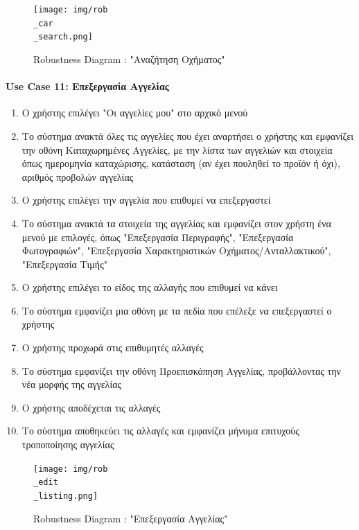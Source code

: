 \documentclass{../ol-softwaremanual}
\begin{document}
	\begin{figure}[htbp!]
		\texttt{[image: img/rob\\\_car\\\_search.png]}
		\caption{\en Robustness Diagram : "\gr Αναζήτηση Οχήματος\en"\gr}
	\end{figure}
	
	
	
	
	\newpage
	\centering
	
	\paragraph{\en Use Case 11: \gr Επεξεργασία Αγγελίας \gr}
	
	\begin{enumerate}
		\item Ο χρήστης επιλέγει \en"\gr Οι αγγελίες μου\en" \gr στο αρχικό μενού
		\item Το σύστημα ανακτά όλες τις αγγελίες που έχει αναρτήσει ο χρήστης και εμφανίζει την οθόνη Καταχωρημένες Αγγελίες, με την λίστα των αγγελιών και στοιχεία όπως ημερομηνία καταχώρισης, κατάσταση (αν έχει πουληθεί το προϊόν ή όχι), αριθμός προβολών αγγελίας
		\item Ο χρήστης επιλέγει την αγγελία που επιθυμεί να επεξεργαστεί
		\item Το σύστημα ανακτά τα στοιχεία της αγγελίας και εμφανίζει στον χρήστη ένα μενού με επιλογές, όπως \en"\gr Επεξεργασία Περιγραφής\en"\gr , \en"\gr Επεξεργασία Φωτογραφιών\en"\gr, \en"\gr Επεξεργασία Χαρακτηριστικών Οχήματος/Ανταλλακτικού\en"\gr, \en"\gr Επεξεργασία Τιμής\en"\gr
		\item Ο χρήστης επιλέγει το είδος της αλλαγής που επιθυμεί να κάνει 
		\item Το σύστημα εμφανίζει μια οθόνη με τα πεδία που επέλεξε να επεξεργαστεί ο χρήστης
		\item Ο χρήστης προχωρά στις επιθυμητές αλλαγές
		\item Το σύστημα εμφανίζει την οθόνη Προεπισκόπηση Αγγελίας, προβάλλοντας την νέα μορφής της αγγελίας
		\item Ο χρήστης αποδέχεται τις αλλαγές
		\item Το σύστημα αποθηκεύει τις αλλαγές και εμφανίζει μήνυμα επιτυχούς τροποποίησης αγγελίας
	\end{enumerate}
	
	
	\begin{figure}[htbp!]
		\texttt{[image: img/rob\\\_edit\\\_listing.png]}
		\caption{\en Robustness Diagram : "\gr Επεξεργασία Αγγελίας\en"\gr}
	\end{figure}
	
\end{document}
